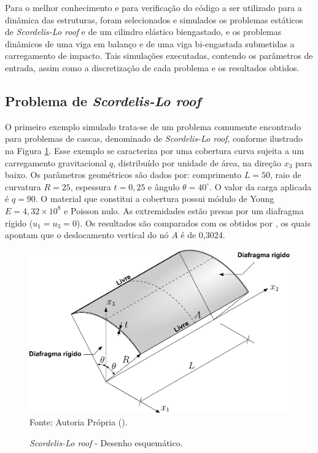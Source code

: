 Para o melhor conhecimento e para verificação do código a ser utilizado para a dinâmica das estruturas, foram selecionados e simulados os problemas estáticos de \textit{Scordelis-Lo roof} e de um cilindro elástico biengastado, e os problemas dinâmicos de uma viga em balanço e de uma viga bi-engastada submetidas a carregamento de impacto. Tais simulações executadas, contendo os parâmetros de entrada, assim como a discretização de cada problema e os resultados obtidos.

\subsection{Problema de \textit{Scordelis-Lo roof}} \label{Ap:SLR}

O primeiro exemplo simulado trata-se de um problema comumente encontrado para problemas de cascas, denominado de \textit{Scordelis-Lo roof}, conforme ilustrado na Figura \ref{fig:scordelis}. Esse exemplo se caracteriza por uma cobertura curva sujeita a um carregamento gravitacional $q$, distribuído por unidade de área, na direção $x_3$ para baixo. Os parâmetros geométricos são dados por: comprimento $L=50$, raio de curvatura $R=25$, espessura $t=0,25$ e ângulo $\theta=40^\circ$. O valor da carga aplicada é $q=90$. O material que constitui a cobertura possui módulo de Young $E=4,32\times10^8$ e Poisson nulo. As extremidades estão presas por um diafragma rígido ($u_1=u_3=0$). Os resultados são comparados com os obtidos por , os quais apontam que o deslocamento vertical do nó $A$ é de 0,3024.

\begin{figure}[h!]
    \centering
    \caption{\textit{Scordelis-Lo roof} - Desenho esquemático.}
    \includegraphics[width=0.75\linewidth]{Figuras/scordelis/scordelis_lo.pdf}
    \\Fonte: Autoria Própria (\the\year).
    \label{fig:scordelis}
\end{figure}

